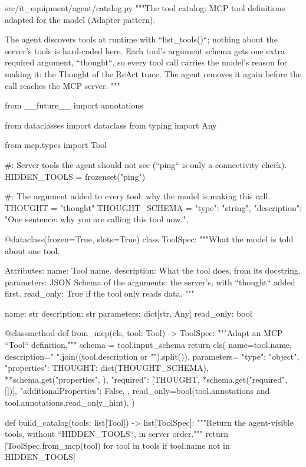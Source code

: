 \documentclass[11pt,letterpaper]{article}
\renewcommand{\_}{\textunderscore\allowbreak}
\begin{document}
\begin{codebox}{src/it_equipment/agent/catalog.py}
"""The tool catalog: MCP tool definitions adapted for the model (Adapter pattern).

The agent discovers tools at runtime with ``list_tools()``; nothing about the server's tools
is hard-coded here. Each tool's argument schema gets one extra required argument,
``thought``, so every tool call carries the model's reason for making it: the Thought of the
ReAct trace. The agent removes it again before the call reaches the MCP server.
"""

from __future__ import annotations

from dataclasses import dataclass
from typing import Any

from mcp.types import Tool

#: Server tools the agent should not see (``ping`` is only a connectivity check).
HIDDEN_TOOLS = frozenset({"ping"})

#: The argument added to every tool: why the model is making this call.
THOUGHT = "thought"
THOUGHT_SCHEMA = {
    "type": "string",
    "description": "One sentence: why you are calling this tool now.",
}


@dataclass(frozen=True, slots=True)
class ToolSpec:
    """What the model is told about one tool.

    Attributes:
        name: Tool name.
        description: What the tool does, from its docstring.
        parameters: JSON Schema of the arguments: the server's, with ``thought`` added first.
        read_only: True if the tool only reads data.
    """

    name: str
    description: str
    parameters: dict[str, Any]
    read_only: bool

    @classmethod
    def from_mcp(cls, tool: Tool) -> ToolSpec:
        """Adapt an MCP ``Tool`` definition."""
        schema = tool.input_schema
        return cls(
            name=tool.name,
            description=" ".join((tool.description or "").split()),
            parameters={
                "type": "object",
                "properties": {THOUGHT: dict(THOUGHT_SCHEMA), **schema.get("properties", {})},
                "required": [THOUGHT, *schema.get("required", [])],
                "additionalProperties": False,
            },
            read_only=bool(tool.annotations and tool.annotations.read_only_hint),
        )


def build_catalog(tools: list[Tool]) -> list[ToolSpec]:
    """Return the agent-visible tools, without ``HIDDEN_TOOLS``, in server order."""
    return [ToolSpec.from_mcp(tool) for tool in tools if tool.name not in HIDDEN_TOOLS]
\end{codebox}
\end{document}

